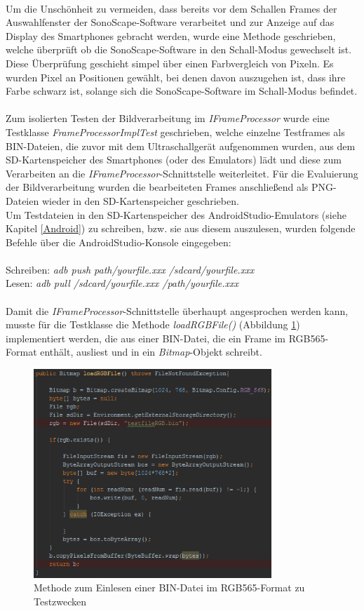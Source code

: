 \clearpage
~\\
Um die Unschönheit zu vermeiden, dass bereits vor dem Schallen Frames der Auswahlfenster der SonoScape-Software verarbeitet und zur Anzeige auf das Display des Smartphones gebracht werden, wurde eine Methode geschrieben, welche überprüft ob die SonoScape-Software in den Schall-Modus gewechselt ist. Diese Überprüfung geschieht simpel über einen Farbvergleich von Pixeln. Es wurden Pixel an Positionen gewählt, bei denen davon auszugehen ist, dass ihre Farbe schwarz ist, solange sich die SonoScape-Software im Schall-Modus befindet.  
\\
\\
Zum isolierten Testen der Bildverarbeitung im \textit{IFrameProcessor} wurde eine Testklasse \textit{FrameProcessorImplTest} geschrieben, welche einzelne Testframes als BIN-Dateien, die zuvor mit dem Ultraschallgerät aufgenommen wurden, aus dem SD-Kartenspeicher des Smartphones (oder des Emulators) lädt und diese zum Verarbeiten an die \textit{IFrameProcessor}-Schnittstelle weiterleitet. Für die Evaluierung der Bildverarbeitung wurden die bearbeiteten Frames anschließend als PNG-Dateien wieder in den SD-Kartenspeicher geschrieben. 
\\
Um Testdateien in den SD-Kartenspeicher des AndroidStudio-Emulators (siehe Kapitel \ref{Android}) zu schreiben, bzw. sie aus diesem auszulesen, wurden folgende Befehle über die AndroidStudio-Konsole eingegeben:
\\
\\
Schreiben: \textit{adb push path/yourfile.xxx /sdcard/yourfile.xxx}
\\
Lesen: \textit{adb pull /sdcard/yourfile.xxx /path/yourfile.xxx}
\\
\\
Damit die \textit{IFrameProcessor}-Schnittstelle überhaupt angesprochen werden kann, musste für die Testklasse die Methode \textit{loadRGBFile()} (Abbildung \ref{fig:BIN_to_Bitmap}) implementiert werden, die aus einer BIN-Datei, die ein Frame im RGB565-Format enthält, ausliest und in ein \textit{Bitmap}-Objekt schreibt. 

\clearpage
\begin{figure}[h]
	\centering
	\includegraphics[width=0.8\textwidth]{Bilder/Bildverarbeitung/BIN_to_Bitmap.PNG}
	\caption{Methode zum Einlesen einer BIN-Datei im RGB565-Format zu Testzwecken}
	\label{fig:BIN_to_Bitmap}
\end{figure}